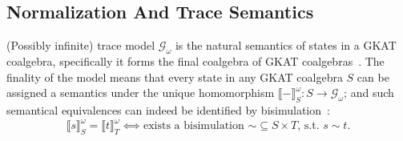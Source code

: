 \documentclass[conference]{IEEEtran}
\newtheorem{lemma}[theorem]{Lemma}
\begin{document}


\subsection{Normalization And Trace Semantics}

(Possibly infinite) trace model \(𝒢_ω\) is the natural semantics of states in a GKAT coalgebra, specifically it forms the final coalgebra of GKAT coalgebras~\cite{schmid_GuardedKleeneAlgebra_2021}.
The finality of the model means that every state in any GKAT coalgebra \(S\) can be assigned a semantics under the unique homomorphism \(⟦-⟧^{ω}_{S}: S → 𝒢_ω\); and such semantical equivalences can indeed be identified by bisimulation~\cite{schmid_GuardedKleeneAlgebra_2021}:
\[⟦s⟧^{ω}_{S} = ⟦t⟧^{ω}_{T} ⟺ \text{exists a bisimulation \({∼} ⊆ S × T\), s.t. \(s ∼ t\)}.\]
\end{document}
